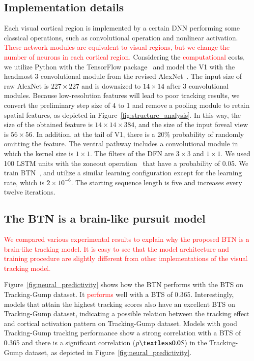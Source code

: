 \documentclass[final,3p,times,twocolumn]{elsarticle}
\begin{document}
\subsection{Implementation details}
Each visual cortical region is implemented by a certain DNN performing some classical operations, such as convolutional operation and nonlinear activation. 
\textcolor{red}{
These network modules are equivalent to visual regions, but we change the number of neurons in each cortical region.}
Considering the \textcolor{red}{computational} costs, we utilize Python with the TensorFlow package~\cite{abadi2015tensorflow} 
and model the V1 with the headmost 3 convolutional module from the revised AlexNet~\cite{imagenet}. 
The input size of raw AlexNet is $227 \times 227$ and is downsized to $14 \times 14$ after 3 convolutional modules. 
Because low-resolution features will lead to poor tracking results, 
we convert the preliminary step size of 4 to 1 
and remove a pooling module to retain spatial features, as depicted in Figure~\ref{fig:structure_analysis}. 
In this way, the size of the obtained feature is $14 \times 14 \times 384$, and the size of the input foveal view is $56 \times 56$.
In addition, at the tail of V1, there is a 20$\%$ probability of randomly omitting the feature. 
The ventral pathway includes a convolutional module in which the kernel size is $1 \times 1$. 
The filters of the DFN are $3 \times 3$ and $1 \times 1$.
We used 100 LSTM units with the zoneout operation~\cite{zoneout} that have a probability of 0.05.
We train BTN~\cite{curriculum}, and utilize a similar learning configuration except for the learning rate, which is $2 \times 10 ^{-6}$.
The starting sequence length is five and increases every twelve iterations. 


\subsection{The BTN is a brain-like pursuit model}
\label{sec:results1}

\textcolor{red}{
We compared various experimental results to explain why the proposed BTN is a brain-like tracking model. 
It is easy to see that the model architecture and training procedure are slightly different from other implementations of the visual tracking model.}

Figure~\ref{fig:neural_predictivity} shows how the BTN performs with the BTS on Tracking-Gump dataset. 
It \textcolor{red}{performs} well with a BTS of 0.365. 
Interestingly, models that attain the highest tracking scores also have an excellent BTS on Tracking-Gump dataset, 
indicating a possible relation between the tracking effect and cortical activation pattern on Tracking-Gump dataset. 
Models with good Tracking-Gump tracking performance show a strong correlation with a BTS of 0.365 and there is a significant correlation ($p \textless 0.05$) in the Tracking-Gump dataset, as depicted in Figure~\ref{fig:neural_predictivity}.
\end{document}
